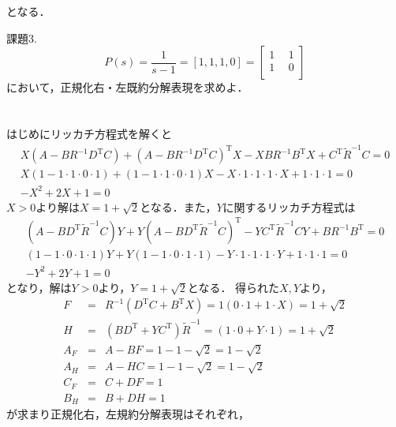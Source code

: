 \documentclass[a4paper,12pt]{jarticle}
\begin{document}
となる．
%
\newpage
 \begin{itembox}[l]{\Large{課題3.}}
%
  \begin{equation}
   P(s)=\frac{1}{s-1}=[1,1,1,0]=\left[
  \begin{array}{c|c}
   1 ~&~ 1  \\ \hline
   1 ~&~ 0   \\ 
  \end{array}
  \right]
  \end{equation}
%
において，正規化右・左既約分解表現を求めよ．  
 \end{itembox}
\vspace{-10mm}
\section*{}
はじめにリッカチ方程式を解くと
%
 \begin{eqnarray}
  X(A-BR^{-1}D^{\mathrm{T}}C)+(A-BR^{-1}D^{\mathrm{T}}C)^{\mathrm{T}}X-XBR^{-1}B^{\mathrm{T}}X+C^{\mathrm{T}}\tilde{R}^{-1}C=0\\
 X(1-1\cdot1\cdot0\cdot1)+(1-1\cdot1\cdot0\cdot1)X-X\cdot1\cdot1\cdot1\cdot
  X+1\cdot1\cdot1=0\\
  -X^2+2X+1=0
\end{eqnarray}
%
$X>0$より解は$X=1+\sqrt{2}$となる．また，$Y$に関するリッカチ方程式は
%
 \begin{eqnarray}
(A-BD^{\mathrm{T}}\tilde{R}^{-1}C)Y+Y(A-BD^{\mathrm{T}}\tilde{R}^{-1}C)^{\mathrm{T}}-YC^{\mathrm{T}}\tilde{R}^{-1}CY+BR^{-1}B^{\mathrm{T}}=0\\
 (1-1\cdot0\cdot1\cdot1)Y+Y(1-1\cdot0\cdot1\cdot1)-Y\cdot1\cdot1\cdot1\cdot
  Y+1\cdot1\cdot1=0\\
  -Y^2+2Y+1=0
\end{eqnarray}
%
となり，解は$Y>0$より，$Y=1+\sqrt{2}$となる．
%
得られた$X,Y$より，
%
\begin{eqnarray}
 F&=&R^{-1}(D^{\mathrm{T}}C+B^{\mathrm{T}}X)=1(0\cdot1+1\cdot X)=1+\sqrt{2}\\
 H&=&(BD^{\mathrm{T}}+YC^{\mathrm{T}})\tilde{R}^{-1}=(1\cdot0+Y\cdot1)=1+\sqrt{2} \\
 A_F&=&A-BF=1-1-\sqrt{2}=1-\sqrt{2}\\
 A_H&=&A-HC=1-1-\sqrt{2}=1-\sqrt{2}\\
 C_F&=&C+DF=1\\
 B_H&=&B+DH=1
\end{eqnarray}
%
が求まり正規化右，左規約分解表現はそれぞれ，
\end{document}
